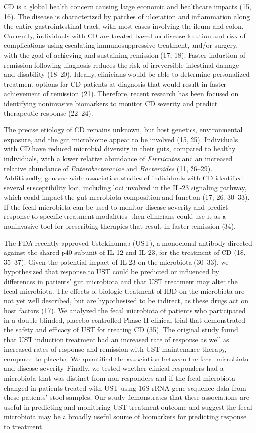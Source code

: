 \documentclass[12pt,]{article}
\begin{document}
CD is a global health concern causing large economic and healthcare
impacts (15, 16). The disease is characterized by patches of ulceration
and inflammation along the entire gastrointestinal tract, with most
cases involving the ileum and colon. Currently, individuals with CD are
treated based on disease location and risk of complications using
escalating immunosuppressive treatment, and/or surgery, with the goal of
achieving and sustaining remission (17, 18). Faster induction of
remission following diagnosis reduces the risk of irreversible
intestinal damage and disability (18--20). Ideally, clinicians would be
able to determine personalized treatment options for CD patients at
diagnosis that would result in faster achievement of remission (21).
Therefore, recent research has been focused on identifying noninvasive
biomarkers to monitor CD severity and predict therapeutic response
(22--24).

The precise etiology of CD remains unknown, but host genetics,
environmental exposure, and the gut microbiome appear to be involved
(15, 25). Individuals with CD have reduced microbial diversity in their
guts, compared to healthy individuals, with a lower relative abundance
of \emph{Firmicutes} and an increased relative abundance of
\emph{Enterobacteraciae} and \emph{Bacteroides} (11, 26--29).
Additionally, genome-wide association studies of individuals with CD
identified several susceptibility loci, including loci involved in the
IL-23 signaling pathway, which could impact the gut microbiota
composition and function (17, 26, 30--33). If the fecal microbiota can
be used to monitor disease severity and predict response to specific
treatment modalities, then clinicians could use it as a noninvasive tool
for prescribing therapies that result in faster remission (34).

The FDA recently approved Ustekinumab (UST), a monoclonal antibody
directed against the shared p40 subunit of IL-12 and IL-23, for the
treatment of CD (18, 35--37). Given the potential impact of IL-23 on the
microbiota (30--33), we hypothesized that response to UST could be
predicted or influenced by differences in patients' gut microbiota and
that UST treatment may alter the fecal microbiota. The effects of
biologic treatment of IBD on the microbiota are not yet well described,
but are hypothesized to be indirect, as these drugs act on host factors
(17). We analyzed the fecal microbiota of patients who participated in a
double-blinded, placebo-controlled Phase II clinical trial that
demonstrated the safety and efficacy of UST for treating CD (35). The
original study found that UST induction treatment had an increased rate
of response as well as increased rates of response and remission with
UST maintenance therapy, compared to placebo. We quantified the
association between the fecal microbiota and disease severity. Finally,
we tested whether clinical responders had a microbiota that was distinct
from non-responders and if the fecal microbiota changed in patients
treated with UST using 16S rRNA gene sequence data from these patients'
stool samples. Our study demonstrates that these associations are useful
in predicting and monitoring UST treatment outcome and suggest the fecal
microbiota may be a broadly useful source of biomarkers for predicting
response to treatment.
\end{document}

